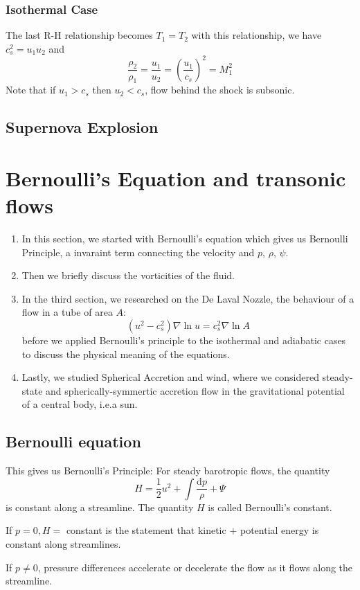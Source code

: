 \documentclass[12pt,a4paper]{article}
\begin{document}
    \subsubsection{Isothermal Case}
    The last R-H relationship becomes $T_1=T_2$
    with this relationship, we have $c_s^2=u_1u_2$ and 
    $$ 
    \frac{\rho_2}{\rho_1}=\frac{u_1}{u_2}=\left(\frac{u_1}{c_s}\right)^2=M_1^2
    $$
    Note that if $u_1>c_s$ then $u_2<c_s$, flow behind the shock is subsonic.
    \subsection{Supernova Explosion}
\section{Bernoulli's Equation and transonic flows}
\begin{enumerate}
    \item In this section, we started with Bernoulli's equation which gives us Bernoulli Principle, a invaraint term connecting the velocity and $p$, $\rho$, $\psi$.
    \item Then we briefly discuss the vorticities of the fluid.
    \item In the third section, we researched on the De Laval Nozzle, the behaviour of a flow in a tube of area $A$:
    $$
    \left(u^2-c_s^2\right) \nabla \ln u=c_s^2 \nabla \ln A
    $$
    before we applied Bernoulli's principle to the isothermal and adiabatic cases to discuss the physical meaning of the equations.
    \item Lastly, we studied Spherical Accretion and wind, where we considered steady-state and spherically-symmertic accretion flow in the gravitational potential of a central body, i.e.a sun.
\end{enumerate}

\subsection{Bernoulli equation}
This gives us Bernoulli's Principle: For steady barotropic flows, the quantity
$$
H=\frac{1}{2} u^2+\int \frac{\mathrm{d} p}{\rho}+\Psi
$$
is constant along a streamline. The quantity $H$ is called Bernoulli's constant.

If $p=0, H=$ constant is the statement that kinetic $+$ potential energy is constant along streamlines.

If $p \neq 0$, pressure differences accelerate or decelerate the flow as it flows along the streamline.
\end{document}
